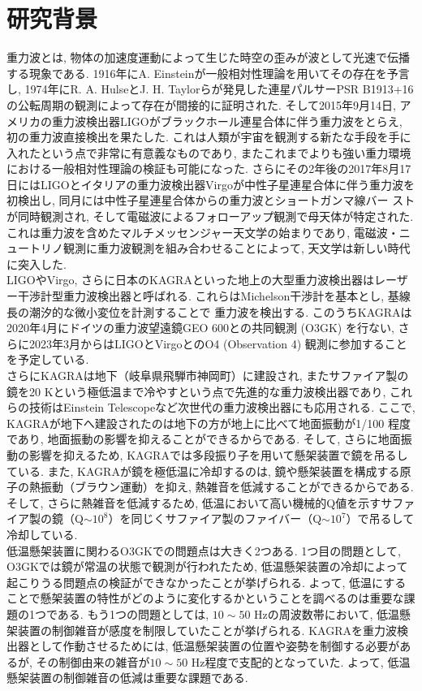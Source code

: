 \section{研究背景}
重力波とは, 物体の加速度運動によって生じた時空の歪みが波として光速で伝播する現象である. 1916年にA. Einsteinが一般相対性理論を用いてその存在を予言し\cite{1,2}, 1974年にR. A. HulseとJ. H. Taylorらが発見した連星パルサーPSR B1913+16の公転周期の観測によって存在が間接的に証明された\cite{3,4}. そして2015年9月14日, アメリカの重力波検出器LIGO\cite{LIGO}がブラックホール連星合体に伴う重力波をとらえ, 初の重力波直接検出を果たした\cite{5}. これは人類が宇宙を観測する新たな手段を手に入れたという点で非常に有意義なものであり, またこれまでよりも強い重力環境における一般相対性理論の検証も可能になった\cite{6,7}. さらにその2年後の2017年8月17日にはLIGOとイタリアの重力波検出器Virgo\cite{Virgo}が中性子星連星合体に伴う重力波を初検出し\cite{8}, 同月には中性子星連星合体からの重力波とショートガンマ線バー ストが同時観測され\cite{9}, そして電磁波によるフォローアップ観測で母天体が特定された\cite{10}. これは重力波を含めたマルチメッセンジャー天文学の始まりであり, 電磁波・ニュートリノ観測に重力波観測を組み合わせることによって, 天文学は新しい時代に突入した\cite{11}. \\
\quad LIGOやVirgo, さらに日本のKAGRA\cite{13}といった地上の大型重力波検出器はレーザー干渉計型重力波検出器と呼ばれる. これらはMichelson干渉計を基本とし, 基線長の潮汐的な微小変位を計測することで 重力波を検出する\cite{LIGO}. このうちKAGRAは2020年4月にドイツの重力波望遠鏡GEO 600\cite{GEO}との共同観測 (O3GK) を行ない, さらに2023年3月からはLIGOとVirgoとのO4 (Observation 4) 観測に参加することを予定している. \\
\quad さらにKAGRAは地下（岐阜県飛騨市神岡町）に建設され\cite{14}, またサファイア製の鏡を20 Kという極低温まで冷やす\cite{15}という点で先進的な重力波検出器であり, これらの技術はEinstein Telescopeなど次世代の重力波検出器にも応用される\cite{16}. ここで, KAGRAが地下へ建設されたのは地下の方が地上に比べて地面振動が1/100 程度であり, 地面振動の影響を抑えることができるからである. そして, さらに地面振動の影響を抑えるため, KAGRAでは多段振り子を用いて懸架装置で鏡を吊るしている. また, KAGRAが鏡を極低温に冷却するのは, 鏡や懸架装置を構成する原子の熱振動（ブラウン運動）を抑え, 熱雑音を低減することができるからである. そして, さらに熱雑音を低減するため, 低温において高い機械的Q値を示すサファイア製の鏡（Q$\sim 10^8$）を同じくサファイア製のファイバー（Q$\sim 10^7$）で吊るして冷却している\cite{18}. \\
\quad 低温懸架装置に関わるO3GKでの問題点は大きく2つある. 1つ目の問題として, O3GKでは鏡が常温の状態で観測が行われたため, 低温懸架装置の冷却によって起こりうる問題点の検証ができなかったことが挙げられる\cite{PTEP}. よって, 低温にすることで懸架装置の特性がどのように変化するかということを調べるのは重要な課題の1つである. もう1つの問題としては, $10\sim50$ Hzの周波数帯において, 低温懸架装置の制御雑音が感度を制限していたことが挙げられる\cite{PTEP}. KAGRAを重力波検出器として作動させるためには, 低温懸架装置の位置や姿勢を制御する必要があるが, その制御由来の雑音が$10\sim50$ Hz程度で支配的となっていた. よって, 低温懸架装置の制御雑音の低減は重要な課題である.

